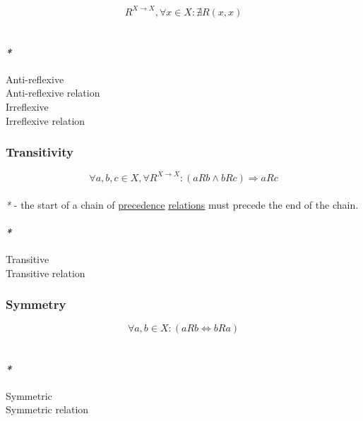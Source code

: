\documentclass[11pt]{article}
\begin{document}
$$ R^{X \to X}, \forall x \in X : \nexists R(x, x) $$\\

\paragraph{\emph{*}}
\label{sec:org6a8136f}

\label{orge62b753}Anti-reflexive\\
\label{org51a6528}Anti-reflexive relation\\
\label{orgfc0fc35}Irreflexive\\
\label{org1ba8c99}Irreflexive relation\\

\subsubsection{\label{org0355f8b}Transitivity}
\label{sec:orgf5732ce}

$$ \forall a,b,c \in X, \forall R^{X \to X} : (aRb \land bRc) \Rightarrow aRc $$\\

\emph{*} - the start of a chain of \hyperref[orgd18f0db]{precedence} \hyperref[org5e14e7d]{relations} must precede the end of the chain.\\

\paragraph{\emph{*}}
\label{sec:org69eb5e2}

\label{org8a18554}Transitive\\
\label{org7a111b2}Transitive relation\\

\subsubsection{\label{org85442a8}Symmetry}
\label{sec:org75fbaac}

$$ \forall a,b \in X : (aRb \iff bRa) $$\\

\paragraph{\emph{*}}
\label{sec:org8d5c1de}

\label{org8248303}Symmetric\\
\label{org88ef040}Symmetric relation\\
\end{document}
